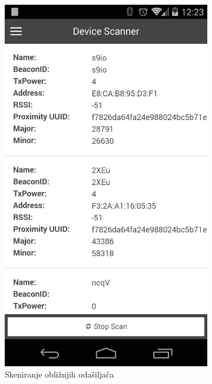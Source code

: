 \begin{figure}[H]
    \centering
    \begin{subfigure}[b]{0.45\textwidth}
        \centering
        \includegraphics[scale=0.15]{pictures/experimental1}
        \caption{Skeniranje obližnjih odašiljača}
        \label{fig:exp1}
    \end{subfigure}
     ~
     \begin{subfigure}[b]{0.45\textwidth}
        \centering

\end{subfigure}
\end{figure}
